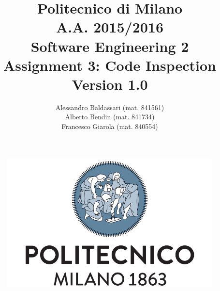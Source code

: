 \documentclass[a4paper,11pt]{report} %
\title{Politecnico di Milano\\A.A. 2015/2016\\Software Engineering 2\\ \bigskip 
Assignment 3: Code Inspection\\
{\normalsize Version 1.0}}
\author{Alessandro Baldassari (mat. 841561) \\ Alberto Bendin (mat. 841734) \\ Francesco Giarola (mat. 840554)}
\begin{document}
	
	
	\begin{figure}[t]
		\centering
		\includegraphics[width=1\linewidth]{"Pictures/polimi-logo"}
		\label{fig:polimi-logo}
	\end{figure}
	
	\maketitle
		
	
	\thispagestyle{empty}
	\clearpage\mbox{}\clearpage

	
	
	
	\renewcommand*\thesection{\arabic{section}}
	\renewcommand*\thesubsection{\arabic{section}.\arabic{subsection}}
	\renewcommand*\thesubsubsection{%
	\arabic{section}.\arabic{subsection}.\arabic{subsubsection}%
	}
	\setcounter{secnumdepth}{4}
	\setcounter{tocdepth}{4}
	
		
	
	\tableofcontents
	\newpage
	
	
	
\end{document}
